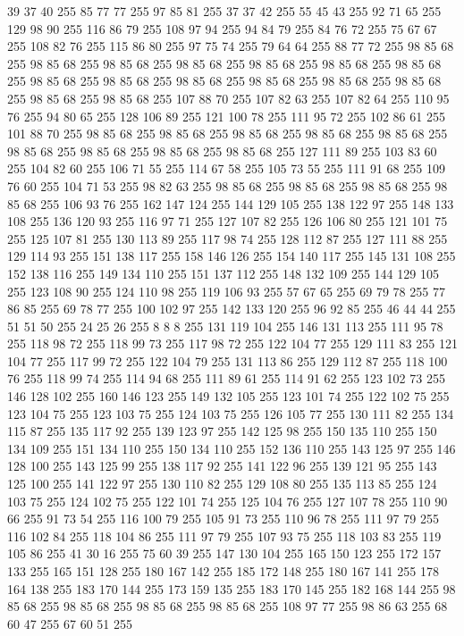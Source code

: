 39 37 40 255 85 77 77 255 97 85 81 255 37 37 42 255 55 45 43 255 92 71 65 255 129 98 90 255 116 86 79 255 108 97 94 255 94 84 79 255 84 76 72 255 75 67 67 255 108 82 76 255 115 86 80 255 97 75 74 255 79 64 64 255 88 77 72 255 98 85 68 255 98 85 68 255 98 85 68 255 98 85 68 255 98 85 68 255 98 85 68 255 98 85 68 255 98 85 68 255 98 85 68 255 98 85 68 255 98 85 68 255 98 85 68 255 98 85 68 255 98 85 68 255 98 85 68 255 107 88 70 255 107 82 63 255 107 82 64 255 110 95 76 255 94 80 65 255 128 106 89 255 121 100 78 255 111 95 72 255 102 86 61 255 101 88 70 255 98 85 68 255 98 85 68 255 98 85 68 255 98 85 68 255 98 85 68 255 98 85 68 255 98 85 68 255 98 85 68 255 98 85 68 255 127 111 89 255 103 83 60 255 104 82 60 255 106 71 55 255 114 67 58 255 105 73 55 255 111 91 68 255 109 76 60 255 104 71 53 255 98 82 63 255 98 85 68 255 98 85 68 255 98 85 68 255
98 85 68 255 106 93 76 255 162 147 124 255 144 129 105 255 138 122 97 255 148 133 108 255 136 120 93 255 116 97 71 255 127 107 82 255 126 106 80 255 121 101 75 255 125 107 81 255 130 113 89 255 117 98 74 255 128 112 87 255 127 111 88 255 129 114 93 255 151 138 117 255 158 146 126 255 154 140 117 255 145 131 108 255 152 138 116 255 149 134 110 255 151 137 112 255 148 132 109 255 144 129 105 255 123 108 90 255 124 110 98 255 119 106 93 255 57 67 65 255 69 79 78 255 77 86 85 255 69 78 77 255 100 102 97 255 142 133 120 255 96 92 85 255 46 44 44 255 51 51 50 255 24 25 26 255 8 8 8 255 131 119 104 255 146 131 113 255 111 95 78 255 118 98 72 255 118 99 73 255 117 98 72 255 122 104 77 255 129 111 83 255 121 104 77 255 117 99 72 255 122 104 79 255 131 113 86 255 129 112 87 255 118 100 76 255 118 99 74 255 114 94 68 255 111 89 61 255 114 91 62 255 123 102 73 255 146 128 102 255 160 146 123 255 149 132 105 255 123 101 74 255 122 102 75 255
123 104 75 255 123 103 75 255 124 103 75 255 126 105 77 255 130 111 82 255 134 115 87 255 135 117 92 255 139 123 97 255 142 125 98 255 150 135 110 255 150 134 109 255 151 134 110 255 150 134 110 255 152 136 110 255 143 125 97 255 146 128 100 255 143 125 99 255 138 117 92 255 141 122 96 255 139 121 95 255 143 125 100 255 141 122 97 255 130 110 82 255 129 108 80 255 135 113 85 255 124 103 75 255 124 102 75 255 122 101 74 255 125 104 76 255 127 107 78 255 110 90 66 255 91 73 54 255 116 100 79 255 105 91 73 255 110 96 78 255 111 97 79 255 116 102 84 255 118 104 86 255 111 97 79 255 107 93 75 255 118 103 83 255 119 105 86 255 41 30 16 255 75 60 39 255 147 130 104 255 165 150 123 255 172 157 133 255 165 151 128 255 180 167 142 255 185 172 148 255 180 167 141 255 178 164 138 255 183 170 144 255 173 159 135 255 183 170 145 255 182 168 144 255 98 85 68 255 98 85 68 255 98 85 68 255 98 85 68 255 108 97 77 255 98 86 63 255 68 60 47 255 67 60 51 255
